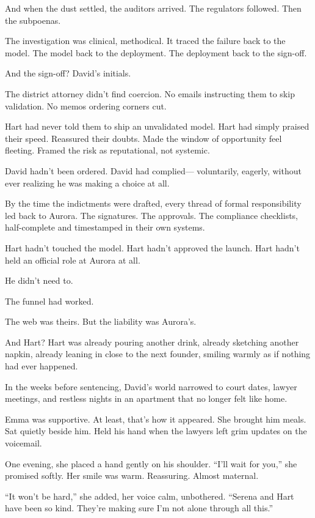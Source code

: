 \medskip

And when the dust settled, the auditors arrived.  
The regulators followed.  
Then the subpoenas.

The investigation was clinical, methodical.  
It traced the failure back to the model.  
The model back to the deployment.  
The deployment back to the sign-off.

And the sign-off?  
David’s initials.

The district attorney didn’t find coercion.  
No emails instructing them to skip validation.  
No memos ordering corners cut.  

Hart had never told them to ship an unvalidated model.  
Hart had simply praised their speed.  
Reassured their doubts.  
Made the window of opportunity feel fleeting.  
Framed the risk as reputational, not systemic.

David hadn’t been ordered.  
David had complied—  
voluntarily, eagerly,  
without ever realizing he was making a choice at all.

By the time the indictments were drafted, every thread of formal responsibility led back to Aurora.  
The signatures.  
The approvals.  
The compliance checklists, half-complete and timestamped in their own systems.

Hart hadn’t touched the model.  
Hart hadn’t approved the launch.  
Hart hadn’t held an official role at Aurora at all.

He didn’t need to.

The funnel had worked.

The web was theirs.  
But the liability was Aurora’s.

And Hart?  
Hart was already pouring another drink,  
already sketching another napkin,  
already leaning in close to the next founder,  
smiling warmly as if nothing had ever happened.

In the weeks before sentencing, David’s world narrowed to court dates, lawyer meetings, and restless nights in an apartment that no longer felt like home.

Emma was supportive. At least, that’s how it appeared.  
She brought him meals. Sat quietly beside him. Held his hand when the lawyers left grim updates on the voicemail.

One evening, she placed a hand gently on his shoulder.  
“I’ll wait for you,” she promised softly.  
Her smile was warm. Reassuring. Almost maternal.  

“It won’t be hard,” she added, her voice calm, unbothered.  
“Serena and Hart have been so kind. They’re making sure I’m not alone through all this.”

